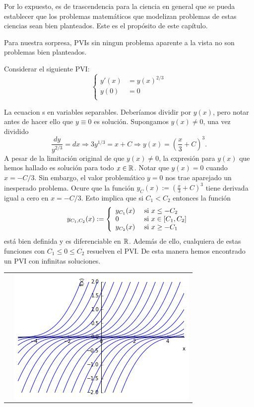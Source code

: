 Por lo expuesto, es de trascendencia para la ciencia en general que se pueda establecer que los problemas matemáticos que modelizan problemas de estas ciencias sean bien planteados. Este es el propósito de este capítulo.


Para nuestra sorpresa, PVIs sin ningun problema aparente a la vista no son problemas bien planteados.

\begin{ejemplo}{} Considerar el siguiente PVI:
\[
  \left\{
 \begin{array}{ll}
    y'(x)&=y(x)^{2/3}\\
    y(0)&=0\\
 \end{array}
 \right.
\]

La ecuacion  s en variables separables. Deberíamos dividir por $y(x)$, pero notar antes de hacer ello que $y\equiv 0$ es solución. Supongamos $y(x)\neq 0$, una vez dividido
\[\frac{dy}{y^{2/3}}=dx\Rightarrow 3y^{1/3}=x+C\Rightarrow y(x)=\left(\frac{x}{3}+C\right)^3.\]
A pesar de la limitación original de que $y(x)\neq 0$, la expresión para $y(x)$ que hemos hallado es solución para todo $x\in\mathbb{R}$. Notar que  $y(x)=0$ cuando $x=-C/3$. Sin embargo, el valor problemático $y=0$ nos trae aparejado un inesperado problema. Ocure  que la función $y_C(x):=\left(\frac{x}{3}+C\right)^3$ tiene derivada igual a cero en $x=-C/3$. Esto implica que si $C_1<C_2$ entonces la función 
\[
  y_{C_1,C_2}(x):=
  \left\{
 \begin{array}{ll}
    y_{C_1}(x)&\hbox{ si } x\leq-C_2\\
    0         &\hbox{ si } x\in [C_1,C_2]\\
    y_{C_2}(x) &\hbox{ si } x\geq -C_1\\
  \end{array}
 \right.
\]
está bien definida y es diferenciable en $\mathbb{R}$. Además de ello, cualquiera de estas funciones con $C_1\leq 0 \leq C_2$ resuelven el PVI.  De esta manera hemos encontrado un PVI con infinitas soluciones.
\end{ejemplo}

\begin{tabular}{m{6cm} m{6cm}}
\begin{minipage}{6cm}
  
\end{minipage}

&
\includegraphics[scale=.4]{imagenes/no-unicidad.png}
 \end{tabular}




